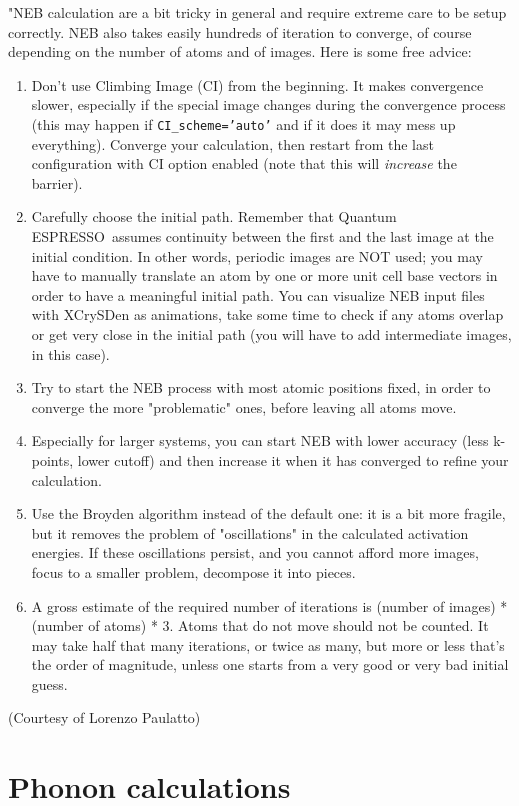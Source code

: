 \documentclass[12pt,a4paper]{article}
\def\qe{{\sc Quantum ESPRESSO}}
\begin{document}
"NEB calculation are a bit tricky in general and require extreme care to be
setup correctly. NEB also takes easily hundreds of iteration to converge,
of course depending on the number of atoms and of images. Here is some
free advice:
\begin{enumerate}
\item 
Don't use Climbing Image (CI) from the beginning. It makes convergence slower, 
especially if the special image changes during the convergence process (this 
may happen if \texttt{CI\_scheme='auto'} and if it does it may mess up everything).
Converge your calculation, then restart from the last configuration with
CI option enabled (note that this will {\em increase} the barrier).
\item
Carefully choose the initial path. Remember that \qe\ assumes continuity
between the first and the last image at the initial condition. In other 
words, periodic images are NOT used; you may have to manually translate
an atom by one or more unit cell base vectors in order to have a meaningful
initial path. You can visualize NEB input files with XCrySDen as animations,
take some time to check if any atoms overlap or get very close in the initial
path (you will have to add intermediate images, in this case).
\item
Try to start the NEB process with most atomic positions fixed, 
in order to converge the more "problematic" ones, before leaving
all atoms move.
\item
Especially for larger systems, you can start NEB with lower accuracy 
(less k-points, lower cutoff) and then increase it when it has
converged to refine your calculation.
\item
Use the Broyden algorithm instead of the default one: it is a bit more
fragile, but it removes the problem of "oscillations" in the calculated
activation energies. If these oscillations persist, and you cannot afford 
more images, focus to a smaller problem, decompose it into pieces.
\item
A gross estimate of the required number of iterations is
(number of images) * (number of atoms) * 3. Atoms that do not
move should not be counted. It may take half that many iterations, 
or twice as many, but more or less that's the order of magnitude, 
unless one starts from a very good or very bad initial guess.
\end{enumerate}
(Courtesy of Lorenzo Paulatto)

\section{Phonon calculations}
\end{document}
